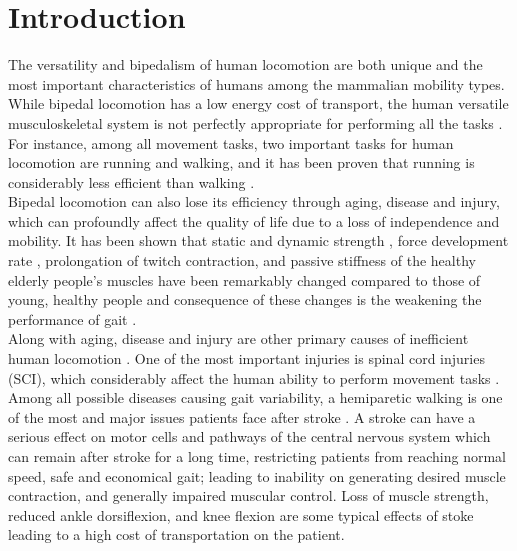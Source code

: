 \documentclass[10pt,letterpaper]{article}
\begin{document}
\section*{\textbf{Introduction}}
The versatility and bipedalism of human locomotion are both unique\cite{1} and the most important characteristics of humans among the mammalian mobility types. While bipedal locomotion has a low energy cost of transport\cite{1}, the human versatile musculoskeletal system is not perfectly appropriate for performing all the tasks \cite{2}. For instance, among all movement tasks, two important tasks for human locomotion are running and walking, and it has been proven that running is considerably less efficient than walking \cite{3,4}.\\
Bipedal locomotion can also lose its efficiency through aging, disease and injury, which can profoundly affect the quality of life \cite{7} due to a loss of independence and mobility. It has been shown that static and dynamic strength \cite{8,9,10}, force development rate \cite{11,12}, prolongation of twitch contraction\cite{9,13}, and passive stiffness\cite{14,15} of the healthy elderly people's muscles have been remarkably changed compared to those of young, healthy people and consequence of these changes is the weakening the performance of gait \cite{16}.\\
Along with aging, disease and injury are other primary causes of inefficient human locomotion . One of the most important injuries is spinal cord injuries (SCI), which considerably affect the human ability to perform movement tasks \cite{17}. Among all possible diseases causing gait variability, a hemiparetic walking is one of the most and major issues patients face after stroke \cite{18,19,20,21}. A stroke can have a serious effect on motor cells and pathways of the central nervous system \cite{19} which can remain after stroke for a long time, restricting patients from reaching normal speed, safe and economical gait\cite{22}; leading to inability on generating desired muscle contraction\cite{19}, and generally impaired muscular control\cite{23}. Loss of muscle strength\cite{24}, reduced ankle dorsiflexion, and knee flexion \cite{25,26} are some typical effects of stoke leading to a high cost of transportation on the patient.\\
\end{document}
